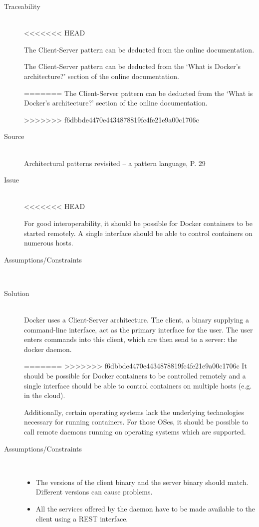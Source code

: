 \begin{description}
\item [Traceability]~\\
<<<<<<< HEAD

The Client-Server pattern can be deducted from the online documentation\cite{dockerarchi}.

The Client-Server pattern can be deducted from the `What is Docker’s architecture?' section of the online documentation\cite{dockerarchi}.


=======
The Client-Server pattern can be deducted from the `What is Docker’s architecture?' section of the online documentation\cite{dockerarchi}.

>>>>>>> f6dbbde4470e4434878819fc4fe21e9a00c1706c
\item [Source]~\\
Architectural patterns revisited -- a pattern language, P. 29 \cite{avgeriou2005architectural}

\item [Issue]~\\
<<<<<<< HEAD

For good interoperability, it should be possible for Docker containers to be started remotely. A single interface should be able to control containers on numerous hosts.

\item [Assumptions/Constraints]~

\item [Solution]~\\
Docker uses a Client-Server architecture. The client, a binary supplying a command-line interface, act as the primary interface for the user. The user enters commands into this client, which are then send to a server: the docker daemon. 

=======
>>>>>>> f6dbbde4470e4434878819fc4fe21e9a00c1706c
It should be possible for Docker containers to be controlled remotely and a single interface should be able to control containers on multiple hosts (e.g. in the cloud).

Additionally, certain operating systems lack the underlying technologies necessary for running containers. For those OSes, it should be possible to call remote daemons running on operating systems which are supported. %

\item [Assumptions/Constraints]~
\begin{itemize}
\item The versions of the client binary and the server binary should match. Different versions can cause problems.
\item All the services offered by the daemon have to be made available to the client using a REST interface.
\end{itemize}


\end{description}
